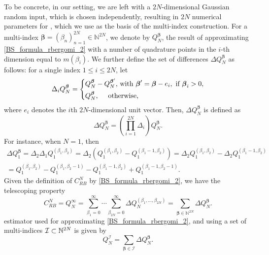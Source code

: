 To be concrete, in our setting, we are left with a $2N$-dimensional Gaussian random input, which is chosen independently, resulting in  $2N$ numerical parameters for , which we use as the basis of the multi-index construction. For a multi-index $\boldsymbol{\beta} = (\beta_n)_{n=1}^{2N} \in \mathbb{N}^{2N}$, we denote  by
$Q_N^{\boldsymbol{\beta}}$,   the result of approximating \eqref{BS_formula_rbergomi_2} with a number of quadrature points  in the $i$-th dimension equal to  $m(\beta_i)$. We further define the set of
differences $\Delta Q_N^{\boldsymbol{\beta}}$ as follows: for a single index $1 \le i \le 2N$,
let
\begin{equation*}
\Delta_i Q_N^{\boldsymbol{\beta}} = \left\{ 
\aligned 
 Q_N^{\boldsymbol{\beta}} &- Q_N^{\boldsymbol{\beta}'}  \text{, with } \boldsymbol{\beta}' =\boldsymbol{\beta} - e_i, \text{ if } \boldsymbol{\beta}_i>0 \COMMA \\
 Q_N^{\boldsymbol{\beta}} &, \quad  \text{ otherwise,}
\endaligned
\right.
\end{equation*}
where $e_i$ denotes the $i$th $2N$-dimensional unit vector. Then, $\Delta
Q_N^{\boldsymbol{\beta}}$ is defined as
\begin{equation*}
\Delta Q_N^{\boldsymbol{\beta}} = \left( \prod_{i=1}^{2N} \Delta_i \right) Q_N^{\boldsymbol{\beta}}.
\end{equation*}
For instance, when $N = 1$, then 
\begin{multline*}
	\Delta Q_1^{\boldsymbol{\beta}} = \Delta_2 \Delta_1 Q_1^{(\beta_1, \beta_2)} = \Delta_2\left( Q_1^{(\beta_1,
		\beta_2)} - Q_1^{(\beta_1-1,\beta_2)} \right) = \Delta_2 Q_1^{(\beta_1,
		\beta_2)} - \Delta_2 Q_1^{(\beta_1-1,\beta_2)} 
	\\= Q_1^{(\beta_1, \beta_2)} - Q_1^{(\beta_1, \beta_2-1)} - Q_1^{(\beta_1-1, \beta_2)} + Q_1^{(\beta_1-1, \beta_2-1)}.
\end{multline*}
Given the definition of $C_{RB}^{N}$ by \eqref{BS_formula_rbergomi_2}, we have the telescoping property
\begin{equation*}
C_{RB}^{N}=Q_N^\infty = \sum_{\beta_1=0}^\infty \cdots \sum_{\beta_{2N} = 0}^\infty \Delta
Q_N^{(\beta_1, \ldots, \beta_{2N})} = \sum_{\boldsymbol{\beta} \in \mathbb{N}^{2N}} \Delta Q_N^{\boldsymbol{\beta}}.
\end{equation*}
  estimator used for approximating \eqref{BS_formula_rbergomi_2}, and using a set of multi-indices $\mathcal{I}\subset \mathbb{N}^{2N}$ is given by
\begin{equation}\label{eq:MISC_quad_estimator}
	Q_N^{\mathcal{I}} = \sum_{\boldsymbol{\beta} \in \mathcal{I}} \Delta Q_N^{\boldsymbol{\beta}}.
\end{equation}
